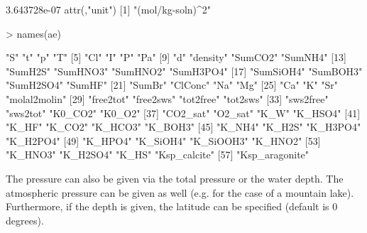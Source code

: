 \documentclass[article,nojss]{jss}
\begin{document}
\begin{Schunk}
\begin{Soutput}
[1] 3.643728e-07
attr(,"unit")
[1] "(mol/kg-soln)^2"
\end{Soutput}
\begin{Sinput}
> names(ae)
\end{Sinput}
\begin{Soutput}
 [1] "S"             "t"             "p"             "T"            
 [5] "Cl"            "I"             "P"             "Pa"           
 [9] "d"             "density"       "SumCO2"        "SumNH4"       
[13] "SumH2S"        "SumHNO3"       "SumHNO2"       "SumH3PO4"     
[17] "SumSiOH4"      "SumBOH3"       "SumH2SO4"      "SumHF"        
[21] "SumBr"         "ClConc"        "Na"            "Mg"           
[25] "Ca"            "K"             "Sr"            "molal2molin"  
[29] "free2tot"      "free2sws"      "tot2free"      "tot2sws"      
[33] "sws2free"      "sws2tot"       "K0_CO2"        "K0_O2"        
[37] "CO2_sat"       "O2_sat"        "K_W"           "K_HSO4"       
[41] "K_HF"          "K_CO2"         "K_HCO3"        "K_BOH3"       
[45] "K_NH4"         "K_H2S"         "K_H3PO4"       "K_H2PO4"      
[49] "K_HPO4"        "K_SiOH4"       "K_SiOOH3"      "K_HNO2"       
[53] "K_HNO3"        "K_H2SO4"       "K_HS"          "Ksp_calcite"  
[57] "Ksp_aragonite"
\end{Soutput}
\end{Schunk}

The pressure can also be given via the total pressure or the water depth. The atmospheric pressure can be given as well (e.g. for the case of a mountain lake). 
Furthermore, if the depth is given, the latitude can be specified (default is 0 degrees).
\end{document}
